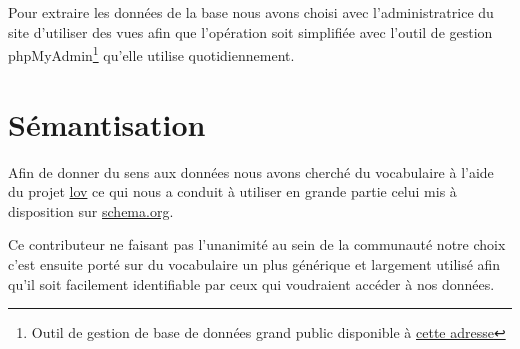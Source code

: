 \documentclass[12pt,a4paper]{article}
\begin{document}
	Pour extraire les données de la base nous avons choisi avec l'administratrice du site d'utiliser des vues afin que l'opération soit simplifiée avec l'outil de gestion phpMyAdmin\footnote{Outil de gestion de base de données grand public disponible à \href{http://www.phpmyadmin.net/home_page/index.php}{cette adresse}} qu'elle utilise quotidiennement.
	
	\section{Sémantisation}	
	Afin de donner du sens aux données nous avons cherché du vocabulaire à l'aide du projet \href{http://lov.okfn.org/dataset/lov/}{lov} ce qui nous a conduit à utiliser en grande partie celui mis à disposition sur \href{http://schema.org}{schema.org}. 
	
	Ce contributeur ne faisant pas l'unanimité au sein de la communauté notre choix c'est ensuite porté sur du vocabulaire un plus générique et largement utilisé afin qu'il soit facilement identifiable par ceux qui voudraient accéder à nos données.
	
\end{document}
